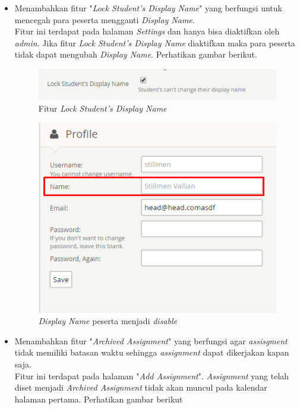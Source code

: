 \documentclass[a4paper,twoside]{article}
\begin{document}
\begin{enumerate}
\begin{itemize}
			\item Menambahkan fitur "\textit{Lock Student's Display Name}" yang berfungsi untuk mencegah para peserta mengganti \textit{Display Name}. \\
			Fitur ini terdapat pada halaman \textit{Settings} dan hanya bisa diaktifkan oleh \textit{admin}. Jika fitur \textit{Lock Student's Display Name} diaktifkan maka para peserta tidak dapat mengubah \textit{Display Name}. Perhatikan gambar berikut.
			
			\begin{figure}[H]
				\centering  
				\includegraphics[scale=1]{lock_fitur}  
				\caption[Fitur \textit{Lock Student's Display Name}]{Fitur \textit{Lock Student's Display Name}} 
				\label{fig:lockfitur} 
			\end{figure} 
			
			\begin{figure}[H]
				\centering  
				\includegraphics[scale=0.5]{locked}  
				\caption[\textit{Display Name} peserta menjadi \textit{disable}]{\textit{Display Name} peserta menjadi \textit{disable}} 
				\label{fig:locked} 
			\end{figure} 
			
			\item Menambahkan fitur "\textit{Archived Assignment}" yang berfungsi agar \textit{assisgment} tidak memiliki batasan waktu sehingga \textit{assignment} dapat dikerjakan kapan saja.  \\
			Fitur ini terdapat pada halaman "\textit{Add Assignment}". \textit{Assignment} yang telah diset menjadi \textit{Archived Assignment} tidak akan muncul pada kalendar halaman pertama. Perhatikan gambar berikut
			

\end{itemize}
\end{enumerate}
\end{document}
